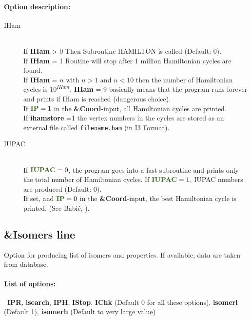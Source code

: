 \documentclass[article,a4paper,twoside]{memoir}
\newcommand{\filename}[1]{\texttt{#1}}
\newcommand{\paramname}[1]{{\color{green}\textbf{#1}}}
\begin{document}
\paragraph{Option description:}
\begin{description}
\item[IHam] \ \\
  If \paramname{IHam} > 0 Then Subroutine HAMILTON is called (Default: 0).\\
  If \paramname{IHam} = 1 Routine will stop after 1 million Hamiltonian cycles are found.\\
  If \paramname{IHam} = $n$ with $n > 1$ and $n < 10$ then the number of Hamiltonian cycles is $10^{IHam}$. \paramname{IHam} = 9 basically means that
  the program runs forever and prints if IHam is reached (dangerous choice).\\
  If $\paramname{IP} = 1$ in the \paramname{\&Coord}-input, all Hamiltonian cycles are printed.\\
  If \paramname{ihamstore} =1 the vertex numbers in the cycles are stored as an external file called \filename{filename.ham} (in I3 Format).
  
\item[IUPAC]\ \\ 
  If $\paramname{IUPAC} = 0$, the program goes into a fast subroutine and prints only the total number of Hamiltonian cycles.  
  If $\paramname{IUPAC} = 1$, IUPAC numbers are produced  (Default: 0).\\
  If set, and $\paramname{IP} = 0$ in the \paramname{\&Coord}-input, the best Hamiltonian cycle is printed.
  (See Babi\'c,  \cite{Babic1995a}).\\
\end{description}


\subsection{\&Isomers line}
 Option for producing list of isomers and properties. If available, data are taken from database.
\paragraph{List of options:}\ \paramname{IPR}, \paramname{isearch}, \paramname{IPH}, \paramname{IStop}, \paramname{IChk} (Default 0 for all these options),
\paramname{isomerl} (Default 1), \paramname{isomerh} (Default to very large value)\\
\end{document}
